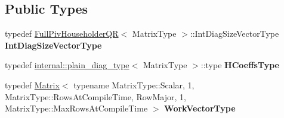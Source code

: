 \subsection*{Public Types}
\begin{DoxyCompactItemize}
\item 
\mbox{\label{struct_eigen_1_1internal_1_1_full_piv_householder_q_r_matrix_q_return_type_a2106e3e1d3cbf5699f5a1f41ea01f802}} 
typedef \mbox{\hyperlink{class_eigen_1_1_full_piv_householder_q_r}{Full\+Piv\+Householder\+QR}}$<$ Matrix\+Type $>$\+::Int\+Diag\+Size\+Vector\+Type {\bfseries Int\+Diag\+Size\+Vector\+Type}
\item 
\mbox{\label{struct_eigen_1_1internal_1_1_full_piv_householder_q_r_matrix_q_return_type_a9c6c57160a8ed7c06d5947d723f6ff94}} 
typedef \mbox{\hyperlink{struct_eigen_1_1internal_1_1plain__diag__type}{internal\+::plain\+\_\+diag\+\_\+type}}$<$ Matrix\+Type $>$\+::type {\bfseries H\+Coeffs\+Type}
\item 
\mbox{\label{struct_eigen_1_1internal_1_1_full_piv_householder_q_r_matrix_q_return_type_a07f618acb4fada7e8d4017d7e341f4ec}} 
typedef \mbox{\hyperlink{class_eigen_1_1_matrix}{Matrix}}$<$ typename Matrix\+Type\+::\+Scalar, 1, Matrix\+Type\+::\+Rows\+At\+Compile\+Time, Row\+Major, 1, Matrix\+Type\+::\+Max\+Rows\+At\+Compile\+Time $>$ {\bfseries Work\+Vector\+Type}
\end{DoxyCompactItemize}

